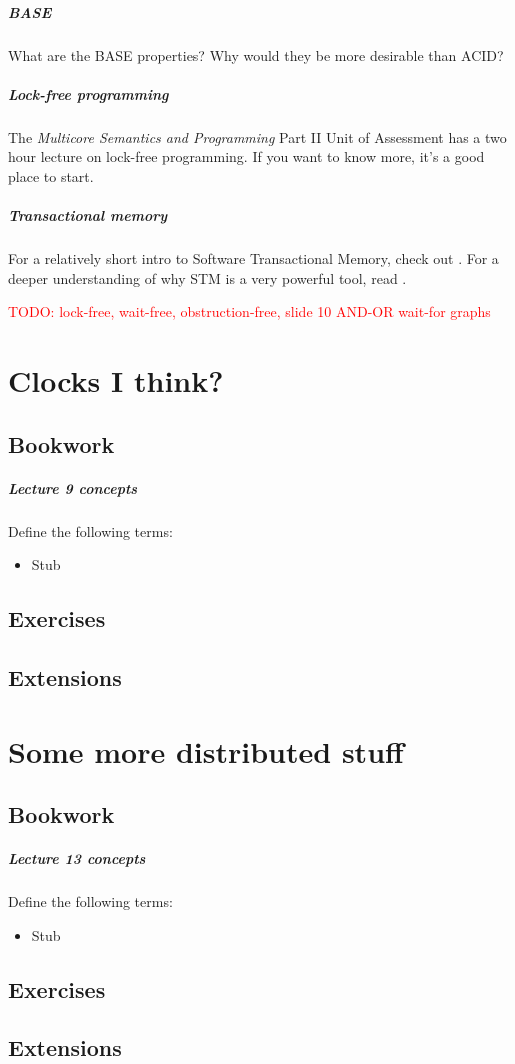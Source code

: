 \documentclass[12pt,a4paper,oneside,openright]{report}
\newcommand{\question}[2]{\paragraph{#1} #2}
\newcommand{\todo}[1]{\textcolor{red}{TODO: #1}}
\begin{document}
\question{BASE}{What are the BASE properties? Why would they be more
  desirable than ACID?}

\question{Lock-free programming}{The \emph{Multicore Semantics and
    Programming} Part II Unit of Assessment has a two hour lecture on
  lock-free programming. If you want to know more, it's a good place
  to start.}

\question{Transactional memory}{For a relatively short intro to
  Software Transactional Memory, check out
  \cite[Chapter~18]{ArtMultiprocessorProgramming}. For a deeper
  understanding of why STM is a very powerful tool, read \cite{CMT}.}

\todo{lock-free, wait-free, obstruction-free, slide 10 AND-OR wait-for
  graphs}

\chapter{Clocks I think?}

\section{Bookwork}

\question{Lecture 9 concepts}{Define the following terms:
  \begin{itemize}
  \item Stub
  \end{itemize}
}

\section{Exercises}

\section{Extensions}

\chapter{Some more distributed stuff}

\section{Bookwork}

\question{Lecture 13 concepts}{Define the following terms:
  \begin{multicols}{2}
    \begin{itemize}
    \item Stub
    \end{itemize}
  \end{multicols}
}

\section{Exercises}

\section{Extensions}




\end{document}
